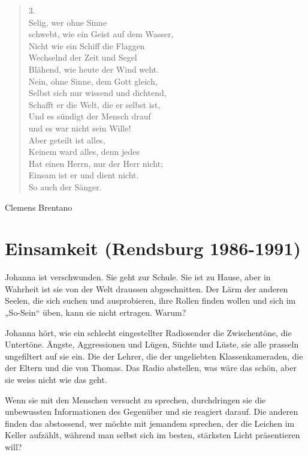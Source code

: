 \documentclass[10pt,a5paper]{book}
\newenvironment{dichter}{\begin{flushright}}{\end{flushright}}
\begin{document}
\begin{verse}
3.\\
Selig, wer ohne Sinne\\
schwebt, wie ein Geist auf dem Wasser,\\
Nicht wie ein Schiff die Flaggen\\
Wechselnd der Zeit und Segel\\
Blähend, wie heute der Wind weht.\\
Nein, ohne Sinne, dem Gott gleich,\\
Selbst sich nur wissend und dichtend,\\
Schafft er die Welt, die er selbst ist,\\
Und es sündigt der Mensch drauf\\
und es war nicht sein Wille!\\
Aber geteilt ist alles,\\
Keinem ward alles, denn jedes\\
Hat einen Herrn, nur der Herr nicht;\\
Einsam ist er und dient nicht.\\
So auch der Sänger.\\
\end{verse}

\begin{dichter}Clemens Brentano\end{dichter}

\section*{Einsamkeit (Rendsburg 1986-1991)}




Johanna ist verschwunden. Sie geht zur Schule. Sie ist zu Hause, aber in Wahrheit ist sie von der Welt draussen abgeschnitten. Der Lärm der anderen Seelen, die sich suchen und ausprobieren, ihre Rollen finden wollen und sich im „So-Sein“ üben, kann sie nicht ertragen. Warum?

Johanna hört, wie ein schlecht eingestellter Radiosender die Zwischentöne, die Untertöne. Ängste, Aggressionen und Lügen, Süchte und Lüste, sie alle prasseln ungefiltert auf sie ein. Die der Lehrer, die der ungeliebten Klassenkameraden, die der Eltern und die von Thomas. Das Radio abstellen, was wäre das schön, aber sie weiss nicht wie das geht.

Wenn sie mit den Menschen versucht zu sprechen, durchdringen sie die unbewussten Informationen des Gegenüber und sie reagiert darauf. Die anderen finden das abstossend, wer möchte mit jemandem sprechen, der die Leichen im Keller aufzählt, während man selbst sich im besten, stärksten Licht präsentieren will?
\end{document}
